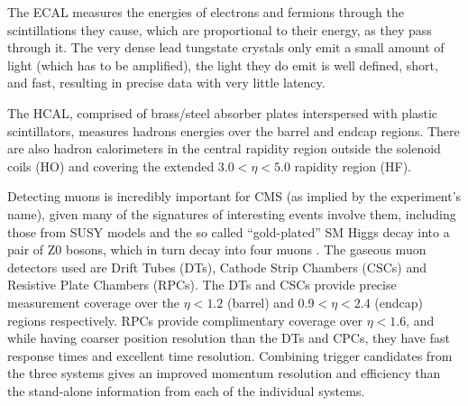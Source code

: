 The ECAL measures the energies of electrons and fermions through the scintillations they cause, which are proportional to their energy, as they pass through it.
The very dense lead tungstate crystals only emit a small amount of light (which has to be amplified), the light they do emit is well defined, short, and fast, resulting in precise data with very little latency\cite{oldcms}. 

The HCAL, comprised of brass/steel absorber plates interspersed with plastic scintillators, measures hadrons energies over the barrel and endcap regions. 
There are also hadron calorimeters in the central rapidity region outside the solenoid coils (HO) and covering the extended $3.0 < \eta < 5.0$ rapidity region (HF)\cite{Bayatian:2006zz}. 

Detecting muons is incredibly important for CMS (as implied by the experiment’s name), given many of the signatures of interesting events involve them, including those from SUSY models and the so called “gold-plated” SM Higgs decay into a pair of Z0 bosons, which in turn decay into four muons . 
The gaseous muon detectors used are Drift Tubes (DTs), Cathode Strip Chambers (CSCs) and Resistive Plate Chambers (RPCs). 
The DTs and CSCs provide precise measurement coverage over the $\eta < 1.2$ (barrel) and $0.9 < \eta < 2.4$ (endcap) regions respectively. 
RPCs provide complimentary coverage over $\eta < 1.6$, and while having coarser position resolution than the DTs and CPCs, they have fast response times and excellent time resolution. 
Combining trigger candidates from the three systems gives an improved momentum resolution and efficiency than the stand-alone information from each of the individual systems\cite{oldcms}. 

